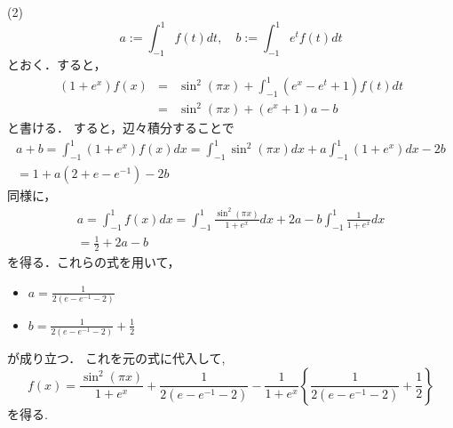 \documentclass[main]{subfiles}
\begin{document}
\begin{pf}
(2)
\begin{equation*}
a := \int^1_{-1}f(t)dt, \quad b := \int^1_{-1}e^tf(t)dt
\end{equation*}
とおく．すると，
\begin{eqnarray*}
(1+e^x)f(x) &=& \sin^2(\pi x)+\int^1_{-1}(e^x-e^t+1)f(t)dt \\
&=&\sin^2(\pi x)+(e^x+1)a - b
\end{eqnarray*}
と書ける．
すると，辺々積分することで
\begin{eqnarray*}
a + b = \int^1_{-1}(1+e^x)f(x)dx = \int^1_{-1}\sin^2(\pi x)dx 
											+ a \int^1_{-1}(1+e^x)dx -2b \\
= 1 + a(2 + e -e^{-1}) -2b
\end{eqnarray*}
同様に，
\begin{eqnarray*}
a = \int^1_{-1}f(x)dx = \int^1_{-1}\frac{\sin^2(\pi x)}{1+e^x}dx
									+ 2a -b\int^1_{-1}\frac{1}{1+e^x}dx \\
									= \frac{1}{2} + 2a - b
\end{eqnarray*}
を得る．これらの式を用いて，
\begin{itemize}
\item $a = \frac{1}{2(e-e^{-1}-2)}$ \\
\item $b = \frac{1}{2(e-e^{-1}-2)} + \frac{1}{2}$
\end{itemize}
が成り立つ．
これを元の式に代入して, 
\begin{equation*}
f(x) = \frac{\sin^2(\pi x)}{1+e^x} + \frac{1}{2(e-e^{-1}-2)} 
	- \frac{1}{1+e^x} \left\{ \frac{1}{2(e-e^{-1}-2)} + \frac{1}{2} \right\}
\end{equation*}
を得る.
\end{pf}
\begin{prob}

\end{prob}
\end{document}

